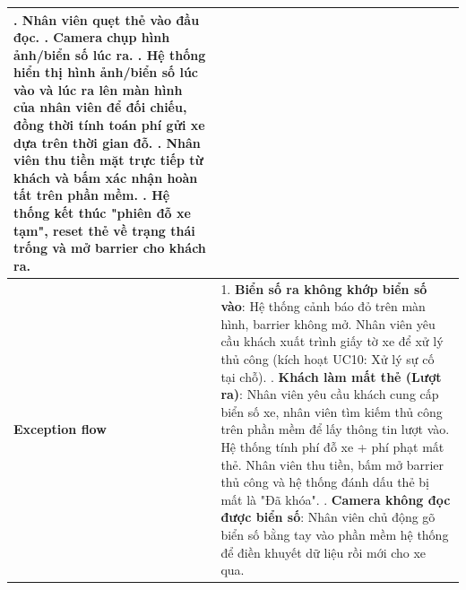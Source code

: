 \begin{center}
\begin{longtable}{|>{\raggedright\arraybackslash}m{3.5cm}|m{12cm}|}
    6. Nhân viên quẹt thẻ vào đầu đọc. \newline
    7. Camera chụp hình ảnh/biển số lúc ra. \newline
    8. Hệ thống hiển thị hình ảnh/biển số lúc vào và lúc ra lên màn hình của nhân viên để đối chiếu, đồng thời tính toán phí gửi xe dựa trên thời gian đỗ. \newline
    9. Nhân viên thu tiền mặt trực tiếp từ khách và bấm xác nhận hoàn tất trên phần mềm. \newline
    10. Hệ thống kết thúc "phiên đỗ xe tạm", reset thẻ về trạng thái trống và mở barrier cho khách ra. \\
\hline
    \textbf{Exception flow} & 
    1. \textbf{Biển số ra không khớp biển số vào}: Hệ thống cảnh báo đỏ trên màn hình, barrier không mở. Nhân viên yêu cầu khách xuất trình giấy tờ xe để xử lý thủ công (kích hoạt UC10: Xử lý sự cố tại chỗ). \newline
    2. \textbf{Khách làm mất thẻ (Lượt ra)}: Nhân viên yêu cầu khách cung cấp biển số xe, nhân viên tìm kiếm thủ công trên phần mềm để lấy thông tin lượt vào. Hệ thống tính phí đỗ xe + phí phạt mất thẻ. Nhân viên thu tiền, bấm mở barrier thủ công và hệ thống đánh dấu thẻ bị mất là "Đã khóa". \newline
    3. \textbf{Camera không đọc được biển số}: Nhân viên chủ động gõ biển số bằng tay vào phần mềm hệ thống để điền khuyết dữ liệu rồi mới cho xe qua. \\
\hline
\end{longtable}
\end{center}